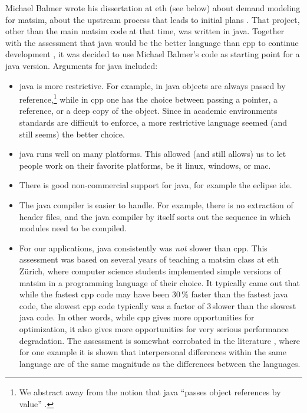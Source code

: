 Michael Balmer wrote his dissertation at \gls{eth} (see below) about demand modeling for \gls{matsim}, \ie about the upstream process that leads to initial plans
\citep{Balmer_PhDThesis_2007}.  That project, other than the main \gls{matsim} code at that time, was written in \gls{java}.  Together with the assessment that \gls{java} would be the better language than \gls{cpp} to continue development%
, it was decided to use Michael Balmer's code as starting point for a \gls{java} version.  Arguments for \gls{java} included:
%
\begin{itemize}\styleItemize
\item  \gls{java} is more restrictive. For example, in \gls{java} objects are always passed by reference,\footnote{%
%
We abstract away from the notion that \gls{java} ``passes object references by value'' \citep{...}.
%
} while in \gls{cpp} one has the choice between passing a pointer, a reference, or a deep copy of the object.  Since in academic environments standards are difficult to enforce, a more restrictive language seemed (and still seems) the better choice.

\item \gls{java} runs well on many platforms.  This allowed (and still allows) us to let people work on their favorite platforms, be it \gls{linux}, \gls{windows}, or \gls{mac}.

\item There is good non-commercial support for \gls{java}, for example the \gls{eclipse} \gls{ide}.

\item The \gls{java} compiler is easier to handle.  For example, there is no extraction of header files, and the \gls{java} compiler by itself sorts out the sequence in which modules need to be compiled.

\item For our applications, \gls{java} consistently was \emph{not} slower than \gls{cpp}.  This assessment was based on several years of teaching a \gls{matsim} class at \gls{eth} Zürich, where computer science students implemented simple versions of \gls{matsim} in a programming language of their choice.  It typically came out that while the fastest \gls{cpp} code may have been 30\,\% faster than the fastest \gls{java} code, the slowest \gls{cpp} code typically was a factor of 3\,slower than the slowest \gls{java} code.  In other words, while \gls{cpp} gives more opportunities for optimization, it also gives more opportunities for very serious performance degradation.  The assessment is somewhat corrobated in the literature \citep{Prechelt1999EfficiencyJavaVsCpp}, where for one example it is shown that interpersonal differences within the same language are of the same magnitude as the differences between the languages.


\end{itemize}
